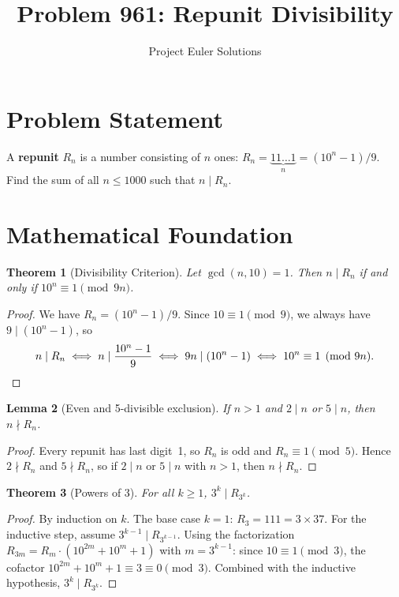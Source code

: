 \documentclass[11pt]{article}
\title{Problem 961: Repunit Divisibility}
\author{Project Euler Solutions}
\date{}
\newtheorem{theorem}{Theorem}
\newtheorem{lemma}[theorem]{Lemma}
\begin{document}
\maketitle

\section{Problem Statement}

A \textbf{repunit} $R_n$ is a number consisting of $n$ ones: $R_n = \underbrace{11\ldots1}_n = (10^n-1)/9$. Find the sum of all $n \le 1000$ such that $n \mid R_n$.

\section{Mathematical Foundation}

\begin{theorem}[Divisibility Criterion]
Let $\gcd(n, 10) = 1$. Then $n \mid R_n$ if and only if $10^n \equiv 1 \pmod{9n}$.
\end{theorem}

\begin{proof}
We have $R_n = (10^n - 1)/9$. Since $10 \equiv 1 \pmod{9}$, we always have $9 \mid (10^n - 1)$, so
\[
n \mid R_n \iff n \mid \frac{10^n - 1}{9} \iff 9n \mid (10^n - 1) \iff 10^n \equiv 1 \pmod{9n}. \qedhere
\]
\end{proof}

\begin{lemma}[Even and 5-divisible exclusion]
If $n > 1$ and $2 \mid n$ or $5 \mid n$, then $n \nmid R_n$.
\end{lemma}

\begin{proof}
Every repunit has last digit~1, so $R_n$ is odd and $R_n \equiv 1 \pmod{5}$. Hence $2 \nmid R_n$ and $5 \nmid R_n$, so if $2 \mid n$ or $5 \mid n$ with $n > 1$, then $n \nmid R_n$.
\end{proof}

\begin{theorem}[Powers of 3]
For all $k \ge 1$, $3^k \mid R_{3^k}$.
\end{theorem}

\begin{proof}
By induction on $k$. The base case $k = 1$: $R_3 = 111 = 3 \times 37$. For the inductive step, assume $3^{k-1} \mid R_{3^{k-1}}$. Using the factorization $R_{3m} = R_m \cdot (10^{2m} + 10^m + 1)$ with $m = 3^{k-1}$: since $10 \equiv 1 \pmod{3}$, the cofactor $10^{2m} + 10^m + 1 \equiv 3 \equiv 0 \pmod{3}$. Combined with the inductive hypothesis, $3^k \mid R_{3^k}$.
\end{proof}
\end{document}
